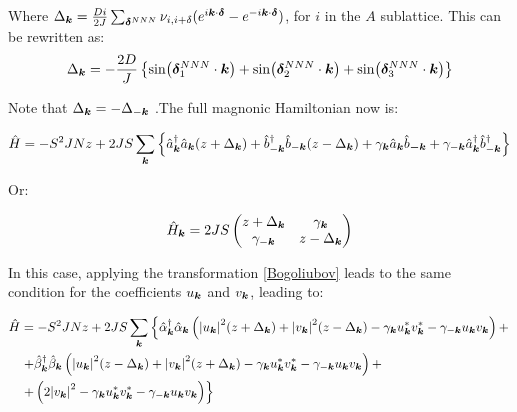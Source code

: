 Where $\Delta_{\boldsymbol{k}} = \frac{Di}{2J}\sum_{\boldsymbol{\delta}^{NNN}} \nu_{i,i+\delta} (e^{i\boldsymbol{k}\cdot\boldsymbol{\delta}} -e^{-i\boldsymbol{k}\cdot\boldsymbol{\delta}})$, for $i$ in the $A$ sublattice. This can be rewritten as:
\begin{equation}
\Delta_{\boldsymbol{k}} = -\frac{2D}{J}\left\{ \sin(\boldsymbol{\delta}^{NNN}_1 \cdot \boldsymbol{k}) + \sin(\boldsymbol{\delta}^{NNN}_2 \cdot \boldsymbol{k}) + \sin(\boldsymbol{\delta}^{NNN}_3 \cdot \boldsymbol{k})\right\}
\end{equation}

Note that $\Delta_{\boldsymbol{k}}=-\Delta_{-\boldsymbol{k}}$ .The full magnonic Hamiltonian now is:

\begin{equation}
\label{MagnonicH2}
\hat{H} = -S^2JNz + 2JS \sum_{\boldsymbol{k}} \left\{ \hat{a}^\dagger_{\boldsymbol{k}}\hat{a}_{\boldsymbol{k}}(z+\Delta_{\boldsymbol{k}}) + \hat{b}^\dagger_{-\boldsymbol{k}}\hat{b}_{-\boldsymbol{k}}(z-\Delta_{\boldsymbol{k}}) + \gamma_{\boldsymbol{k}}\hat{a}_{\boldsymbol{k}}\hat{b}_{\boldsymbol{-k}} + \gamma_{-\boldsymbol{k}}\hat{a}^\dagger_{\boldsymbol{k}}\hat{b}^\dagger_{-\boldsymbol{k}} \right\}
\end{equation}

Or:

\begin{equation}
\hat{H}_{\boldsymbol{k}} = 2JS\begin{pmatrix} 
z + \Delta_{\boldsymbol{k}}& \gamma_{\boldsymbol{k}} \\
\gamma_{-\boldsymbol{k}} & z - \Delta_{\boldsymbol{k}}
\end{pmatrix} \label{MatrixMagnonDMI}
\end{equation}

In this case, applying the transformation \ref{Bogoliubov} leads to the same condition for the coefficients  $u_{\boldsymbol{k}}$ and $v_{\boldsymbol{k}}$, leading to:

\begin{align*}
\hat{H} &= -S^2JNz  + 2JS\sum_{\boldsymbol{k}} \left\{ \hat{\alpha}_{\boldsymbol{k}}^\dagger \hat{\alpha}_{\boldsymbol{k}} \left( \abs{u_{\boldsymbol{k}}}^2(z+\Delta_{\boldsymbol{k}}) + \abs{v_{\boldsymbol{k}}}^2(z-\Delta_{\boldsymbol{k}}) -\gamma_{\boldsymbol{k}}u_{\boldsymbol{k}}^*v_{\boldsymbol{k}}^*-\gamma_{-\boldsymbol{k}}u_{\boldsymbol{k}}v_{\boldsymbol{k}} \right) + \right. \\
&\left. + \hat{\beta}_{\boldsymbol{k}}^\dagger \hat{\beta}_{\boldsymbol{k}} \left( \abs{u_{\boldsymbol{k}}}^2(z-\Delta_{\boldsymbol{k}}) + \abs{v_{\boldsymbol{k}}}^2(z+\Delta_{\boldsymbol{k}}) -\gamma_{\boldsymbol{k}}u_{\boldsymbol{k}}^*v_{\boldsymbol{k}}^*-\gamma_{-\boldsymbol{k}}u_{\boldsymbol{k}}v_{\boldsymbol{k}} \right) + \right. \\
&\left. + \left( 2\abs{v_{\boldsymbol{k}}}^2 - \gamma_{\boldsymbol{k}}u_{\boldsymbol{k}}^*v_{\boldsymbol{k}}^*-\gamma_{-\boldsymbol{k}}u_{\boldsymbol{k}}v_{\boldsymbol{k}}\right) \right\}
\end{align*}

